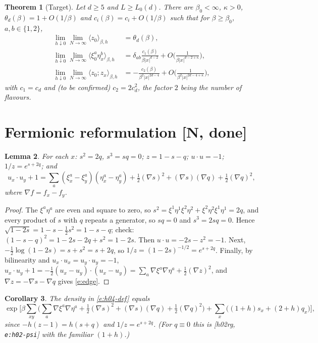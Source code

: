 \documentclass[11pt]{article}
\newtheorem{theorem}{Theorem}[section]
\newtheorem{lemma}[theorem]{Lemma}
\newtheorem{corollary}[theorem]{Corollary}
\theoremstyle{remark}
\theoremstyle{definition}
\newcommand{\avg}[1]{\langle #1\rangle}
\newcommand{\st}[1]{\textsf{[#1]}}
\newcommand{\hr}[1]{\textup{[h02rg, \texttt{#1}]}}
\begin{document}
\begin{theorem}[Target]\label{thm:A}
Let $d\ge5$ and $L\ge L_0(d)$. There are $\beta_0<\infty$, $\kappa>0$,
$\theta_d(\beta)=1+O(1/\beta)$ and $c_i(\beta)=c_i+O(1/\beta)$ such that for $\beta\ge\beta_0$, $a,b\in\{1,2\}$,
\begin{align}
  \lim_{h\downarrow0}\lim_{N\to\infty}\avg{z_0}_{\beta,h}&=\theta_d(\beta),\\
  \lim_{h\downarrow0}\lim_{N\to\infty}\avg{\xi^a_0\eta^b_x}_{\beta,h}&=\delta_{ab}\frac{c_1(\beta)}{\beta|x|^{d-2}}+O\Big(\frac1{\beta|x|^{d-2+\kappa}}\Big),\\
  \lim_{h\downarrow0}\lim_{N\to\infty}\avg{z_0;z_x}_{\beta,h}&=-\frac{c_2(\beta)}{\beta^2|x|^{2d-4}}+O\Big(\frac1{\beta^2|x|^{2d-4+\kappa}}\Big),
\end{align}
with $c_1=c_d$ and (to be confirmed) $c_2=2c_d^2$, the factor $2$ being the number of flavours.
\end{theorem}

\section{Fermionic reformulation \st{N, done}}

\begin{lemma}\label{lem:alg}
For each $x$: $s^2=2q$, $s^3=sq=0$; $z=1-s-q$; $u\cdot u=-1$; $1/z=e^{s+2q}$; and
\begin{equation}\label{e:edge}
  u_x\cdot u_y+1=\sum_a(\xi^a_x-\xi^a_y)(\eta^a_x-\eta^a_y)+\tfrac12(\nabla s)^2+(\nabla s)(\nabla q)+\tfrac12(\nabla q)^2,
\end{equation}
where $\nabla f=f_x-f_y$.
\end{lemma}

\begin{proof}
The $\xi^a\eta^a$ are even and square to zero, so $s^2=\xi^1\eta^1\xi^2\eta^2+\xi^2\eta^2\xi^1\eta^1=2q$, and every product of $s$ with $q$
repeats a generator, so $sq=0$ and $s^3=2sq=0$.
Hence $\sqrt{1-2s}=1-s-\tfrac12 s^2=1-s-q$; check: $(1-s-q)^2=1-2s-2q+s^2=1-2s$.
Then $u\cdot u=-2s-z^2=-1$.
Next, $-\tfrac12\log(1-2s)=s+s^2=s+2q$, so $1/z=(1-2s)^{-1/2}=e^{s+2q}$.
Finally, by bilinearity and $u_x\cdot u_x=u_y\cdot u_y=-1$,
$u_x\cdot u_y+1=-\tfrac12(u_x-u_y)\cdot(u_x-u_y)=\sum_a\nabla\xi^a\nabla\eta^a+\tfrac12(\nabla z)^2$,
and $\nabla z=-\nabla s-\nabla q$ gives \eqref{e:edge}.
\end{proof}

\begin{corollary}\label{cor:density}
The density in \eqref{e:h04-def} equals
\begin{equation}
  \exp\Big[\beta\sum_{xy}\Big(\sum_a\nabla\xi^a\nabla\eta^a+\tfrac12(\nabla s)^2+(\nabla s)(\nabla q)+\tfrac12(\nabla q)^2\Big)
  +\sum_x\big((1+h)s_x+(2+h)q_x\big)\Big],
\end{equation}
since $-h(z-1)=h(s+q)$ and $1/z=e^{s+2q}$. (For $q\equiv0$ this is \hr{e:h02-psi} with the familiar $(1+h)$.)
\end{corollary}
\end{document}
